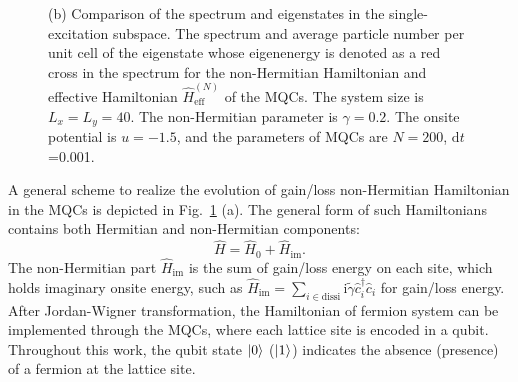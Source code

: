 \documentclass[longbibliography, aps, prx, amsmath, amssymb, amsfonts, twocolumn,superscriptaddress, footinbib]{revtex4-1}
\begin{document}
\begin{figure}[htbp]
{		(b) Comparison of the spectrum and eigenstates in the single-excitation subspace. The spectrum and average particle number per unit cell of the eigenstate whose eigenenergy is denoted as a red cross in the spectrum for the non-Hermitian Hamiltonian and effective Hamiltonian $\hat{H}_{\mathrm{eff}}^{(N)}$ of the MQCs. The system size is $L_x=L_y=40$. The non-Hermitian parameter is $\gamma=0.2$. The onsite potential is $u=-1.5$, and the parameters of MQCs are $N=200$, $\mathrm{d}t$=0.001.
		}
		\label{fig:01}
	\end{figure}

	A general scheme to realize the evolution of gain/loss non-Hermitian Hamiltonian in the MQCs is depicted in Fig.~\ref{fig:01} (a).
	The general form of such Hamiltonians contains both Hermitian and non-Hermitian components:
	\begin{equation}
		\hat{H} = \hat{H}_0 +\hat{H}_{\text{im}}. \label{eq:non-hermitian}
	\end{equation}
	The non-Hermitian part $\hat{H}_{\text{im}}$ is the sum of gain/loss energy on each site, which holds imaginary onsite energy, such as $\hat{H}_{\text{im}} = \sum_{i\in \text{dissi}} \mathrm{i}\tilde{\gamma} \hat{c}_i^{\dagger} \hat{c}_i$ for gain/loss energy. 
	After Jordan-Wigner transformation, the Hamiltonian of fermion system can be implemented through the MQCs, where each lattice site is encoded in a qubit. 
	Throughout this work, the qubit state $\ket{0}$ ($\ket{1}$) indicates the absence (presence) of a fermion at the lattice site.
\end{document}
